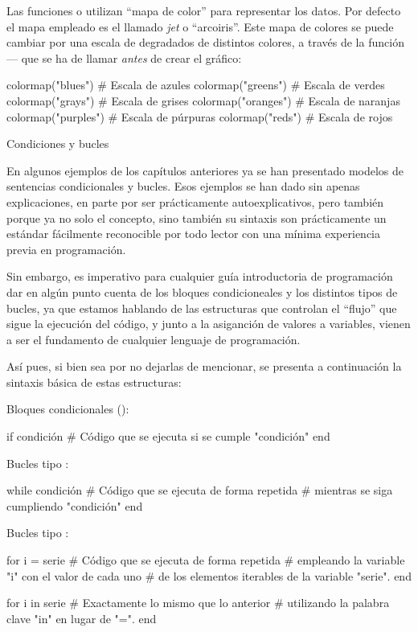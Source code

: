 ﻿\documentclass[spanish]{article}
\begin{document}
Las funciones  o  utilizan ``mapa de color'' para representar los datos. Por defecto el mapa empleado es el llamado \emph{jet} o ``arcoiris''. Este mapa de colores se puede cambiar por una escala de degradados de distintos colores, a través de la función  --- que se ha de llamar \emph{antes} de crear el gráfico:

colormap("blues")   # Escala de azules
colormap("greens")  # Escala de verdes
colormap("grays")   # Escala de grises
colormap("oranges") # Escala de naranjas
colormap("purples") # Escala de púrpuras
colormap("reds")    # Escala de rojos


Condiciones y bucles

En algunos ejemplos de los capítulos anteriores ya se han presentado modelos de sentencias condicionales y bucles. Esos ejemplos se han dado sin apenas explicaciones, en parte por ser prácticamente autoexplicativos, pero también porque ya no solo el concepto, sino también su sintaxis son prácticamente un estándar fácilmente reconocible por todo lector con una mínima experiencia previa en programación.

Sin embargo, es imperativo para cualquier guía introductoria de programación dar en algún punto cuenta de los bloques condicioneales y los distintos tipos de bucles, ya que estamos hablando de las estructuras que controlan el ``flujo'' que sigue la ejecución del código, y junto a la asiganción de valores a variables, vienen a ser el fundamento de cualquier lenguaje de programación.

Así pues, si bien sea por no dejarlas de mencionar, se presenta a continuación la sintaxis básica de estas estructuras:

Bloques condicionales ():

if condición
  # Código que se ejecuta si se cumple "condición"
end

Bucles tipo :

while condición
  # Código que se ejecuta de forma repetida
  # mientras se siga cumpliendo "condición"
end

Bucles tipo :

for i = serie
  # Código que se ejecuta de forma repetida
  # empleando la variable "i" con el valor de cada uno
  # de los elementos iterables de la variable "serie".
end

for i in serie
  # Exactamente lo mismo que lo anterior
  # utilizando la palabra clave "in" en lugar de "=".
end
\end{document}
